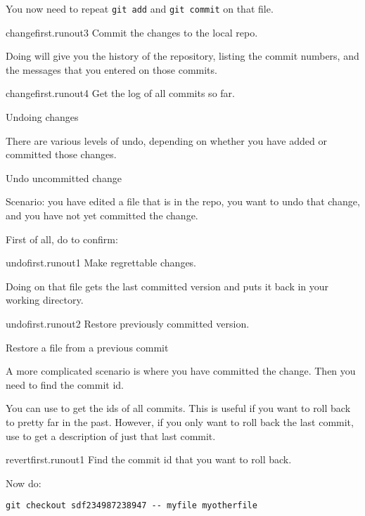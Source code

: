 You now need to repeat \lstinline{git add} and \lstinline{git commit} on that file.

\begin{gitstep}{changefirst.runout3}
  Commit the changes to the local repo.
\end{gitstep}

Doing  will give you the history of the repository,
listing the commit numbers, and the messages that you entered on those commits.

\begin{gitstep}{changefirst.runout4}
  Get the log of all commits so far.
\end{gitstep}

\newpage
{} {Undoing changes}

There are various levels of undo, depending on whether you have added or committed
those changes.

 {Undo uncommitted change}

Scenario: you have edited a file that is in the repo,
you want to undo that change,
and you have not yet committed the change.

First of all, do  to confirm:

\begin{gitstep}{undofirst.runout1}
  Make regrettable changes.
\end{gitstep}

Doing  on that file gets the last committed version
and puts it back in your working directory.

\begin{gitstep}{undofirst.runout2}
  Restore previously committed version.
\end{gitstep}

\newpage
{} {Restore a file from a previous commit}

A more complicated scenario is where you have committed the change.
Then you need to find the commit id.

You can use  to get the ids of all commits.
This is useful if you want to roll back to pretty far in the past.
However, if you only want to roll back the last commit,
use  to get a description of just that last commit.

\begin{gitstep}{revertfirst.runout1}
  Find the commit id that you want to roll back.
\end{gitstep}

Now do:
\begin{lstlisting}
git checkout sdf234987238947 -- myfile myotherfile
\end{lstlisting}

